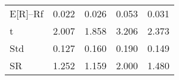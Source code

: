 \begin{tabular}{lrrrr}
\toprule
\midrule
E[R]--Rf & 0.022 & 0.026 & 0.053 & 0.031 \\
t & 2.007 & 1.858 & 3.206 & 2.373 \\
Std & 0.127 & 0.160 & 0.190 & 0.149 \\
SR & 1.252 & 1.159 & 2.000 & 1.480 \\
\bottomrule
\end{tabular}
